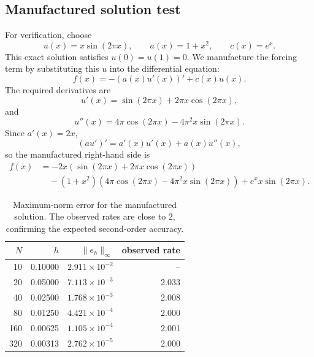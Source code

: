 \documentclass[11pt]{article}
\begin{document}
\subsection{Manufactured solution test}

For verification, choose
\begin{equation}
    u(x)=x\sin(2\pi x), \qquad
    a(x)=1+x^2, \qquad
    c(x)=e^x.
\end{equation}
This exact solution satisfies $u(0)=u(1)=0$.  We manufacture the forcing term by substituting this $u$ into the differential equation:
\begin{equation}
    f(x)=-(a(x)u'(x))' + c(x)u(x).
\end{equation}
The required derivatives are
\begin{equation}
    u'(x)=\sin(2\pi x)+2\pi x\cos(2\pi x),
\end{equation}
and
\begin{equation}
    u''(x)=4\pi\cos(2\pi x)-4\pi^2x\sin(2\pi x).
\end{equation}
Since $a'(x)=2x$,
\begin{equation}
    (a u')'=a'(x)u'(x)+a(x)u''(x),
\end{equation}
so the manufactured right-hand side is
\begin{equation}
    \begin{aligned}
    f(x)
    &=
    -2x\left(\sin(2\pi x)+2\pi x\cos(2\pi x)\right)\\
    &\quad
    -(1+x^2)\left(4\pi\cos(2\pi x)-4\pi^2x\sin(2\pi x)\right)
    +e^x x\sin(2\pi x).
    \end{aligned}
    \label{eq:manufactured-f}
\end{equation}

\begin{table}[H]
    \centering
    \caption{Maximum-norm error for the manufactured solution.  The observed rates are close to $2$, confirming the expected second-order accuracy.}
    \begin{tabular}{@{}rrrr@{}}
        \toprule
        $N$ & $h$ & $\|e_h\|_{\infty}$ & observed rate \\
        \midrule
        10  & 0.10000 & $2.911\times 10^{-2}$ & -- \\
        20  & 0.05000 & $7.113\times 10^{-3}$ & 2.033 \\
        40  & 0.02500 & $1.768\times 10^{-3}$ & 2.008 \\
        80  & 0.01250 & $4.421\times 10^{-4}$ & 2.000 \\
        160 & 0.00625 & $1.105\times 10^{-4}$ & 2.001 \\
        320 & 0.00313 & $2.762\times 10^{-5}$ & 2.000 \\
        \bottomrule
    \end{tabular}
    \label{tab:problem1-convergence}
\end{table}
\end{document}
